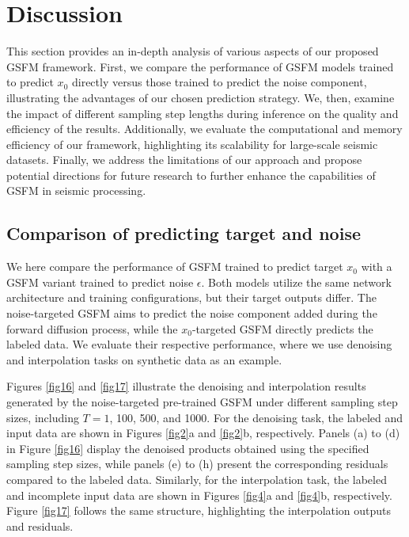 \section{Discussion}
This section provides an in-depth analysis of various aspects of our proposed GSFM framework. First, we compare the performance of GSFM models trained to predict $x_0$ directly versus those trained to predict the noise component, illustrating the advantages of our chosen prediction strategy. We, then, examine the impact of different sampling step lengths during inference on the quality and efficiency of the results. Additionally, we evaluate the computational and memory efficiency of our framework, highlighting its scalability for large-scale seismic datasets. Finally, we address the limitations of our approach and propose potential directions for future research to further enhance the capabilities of GSFM in seismic processing. 

\subsection{Comparison of predicting target and noise}
We here compare the performance of GSFM trained to predict target $x_0$ with a GSFM variant trained to predict noise $\epsilon$. Both models utilize the same network architecture and training configurations, but their target outputs differ. The noise-targeted GSFM aims to predict the noise component added during the forward diffusion process, while the $x_0$-targeted GSFM directly predicts the labeled data. We evaluate their respective performance, where we use denoising and interpolation tasks on synthetic data as an example. 

Figures \ref{fig16} and \ref{fig17} illustrate the denoising and interpolation results generated by the noise-targeted pre-trained GSFM under different sampling step sizes, including $T=1$, 100, 500, and 1000. For the denoising task, the labeled and input data are shown in Figures \ref{fig2}a and \ref{fig2}b, respectively. Panels (a) to (d) in Figure \ref{fig16} display the denoised products obtained using the specified sampling step sizes, while panels (e) to (h) present the corresponding residuals compared to the labeled data. Similarly, for the interpolation task, the labeled and incomplete input data are shown in Figures \ref{fig4}a and \ref{fig4}b, respectively. Figure \ref{fig17} follows the same structure, highlighting the interpolation outputs and residuals. 

